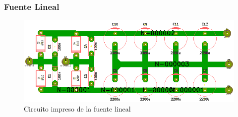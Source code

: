 \subsubsection{Fuente Lineal}
\begin{figure}[hbtp]
\centering
\centerline{\includegraphics[scale=0.53]{img/circuito_impreso_fuente_lineal.png}}
\caption{Circuito impreso de la fuente lineal}
\end{figure}
